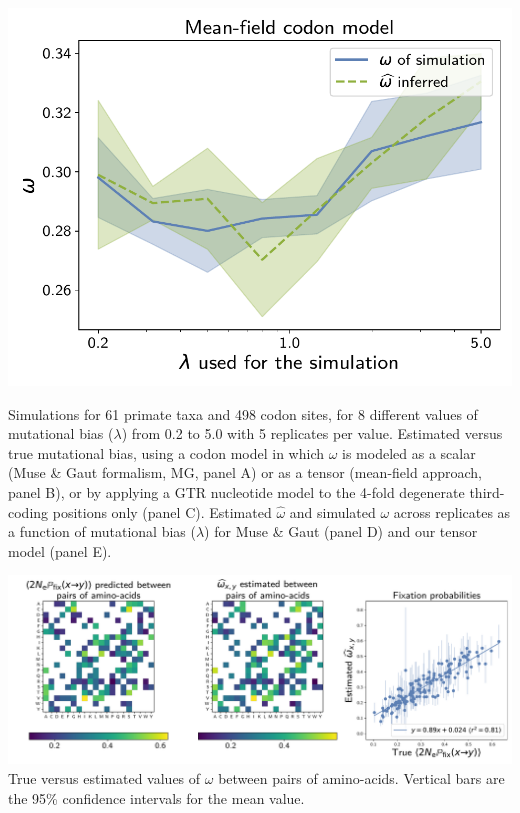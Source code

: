 \documentclass{article}
\begin{document}
\begin{center}
    \begin{minipage}{0.325\linewidth}
        \includegraphics[width=\linewidth, page=1]{inference_supp_mat/PrimatesExons1Mu1.0_omega_MF.pdf}
    \end{minipage}
\end{center}
Simulations for 61 primate taxa and 498 codon sites, for 8 different values of mutational bias ($\lambda$) from 0.2 to 5.0 with 5 replicates per value.
Estimated versus true mutational bias, using a codon model in which $\omega$ is modeled as a scalar (Muse \& Gaut formalism, MG, panel A) or as a tensor (mean-field approach, panel B), or by applying a GTR nucleotide model to the 4-fold degenerate third-coding positions only (panel C).
Estimated $\hat{\omega}$ and simulated $\omega$ across replicates as a function of mutational bias ($\lambda$) for Muse \& Gaut (panel D) and our tensor model (panel E).

\includegraphics[width=\linewidth, page=1]{inference_supp_mat/PrimatesExons1Mu1.0_omega_pair_MF.pdf}
True versus estimated values of $\omega$ between pairs of amino-acids.
Vertical bars are the 95\% confidence intervals for the mean value.
\end{document}
